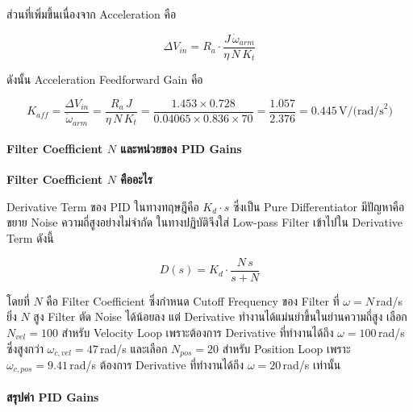 ส่วนที่เพิ่มขึ้นเนื่องจาก Acceleration คือ

\begin{equation}
  \Delta V_{in} = R_a \cdot \frac{J\,\dot{\omega}_{arm}}{\eta\, N\, K_t}
  \label{eq:dvin_accel}
\end{equation}

ดังนั้น Acceleration Feedforward Gain คือ

\begin{equation}
  K_{aff} = \frac{\Delta V_{in}}{\dot{\omega}_{arm}}
           = \frac{R_a\, J}{\eta\, N\, K_t}
           = \frac{1.453 \times 0.728}{0.04065 \times 0.836 \times 70}
           = \frac{1.057}{2.376} = 0.445\,\text{V/(rad/s}^2\text{)}
  \label{eq:Kaff}
\end{equation}

\paragraph{Filter Coefficient $N$ และหน่วยของ PID Gains}

\textbf{Filter Coefficient $N$ คืออะไร}

Derivative Term ของ PID ในทางทฤษฎีคือ $K_d \cdot s$ ซึ่งเป็น Pure Differentiator
มีปัญหาคือขยาย Noise ความถี่สูงอย่างไม่จำกัด
ในทางปฏิบัติจึงใส่ Low-pass Filter เข้าไปใน Derivative Term ดังนี้

\begin{equation}
  D(s) = K_d \cdot \frac{N\,s}{s + N}
  \label{eq:derivative_filter}
\end{equation}

โดยที่ $N$ คือ Filter Coefficient ซึ่งกำหนด Cutoff Frequency ของ Filter
ที่ $\omega = N$\,rad/s ยิ่ง $N$ สูง Filter ตัด Noise ได้น้อยลง
แต่ Derivative ทำงานได้แม่นยำขึ้นในย่านความถี่สูง
เลือก $N_{vel} = 100$ สำหรับ Velocity Loop เพราะต้องการ Derivative
ที่ทำงานได้ถึง $\omega = 100$\,rad/s ซึ่งสูงกว่า $\omega_{c,vel} = 47$\,rad/s
และเลือก $N_{pos} = 20$ สำหรับ Position Loop เพราะ $\omega_{c,pos} = 9.41$\,rad/s
ต้องการ Derivative ที่ทำงานได้ถึง $\omega = 20$\,rad/s เท่านั้น

\paragraph{สรุปค่า PID Gains}

